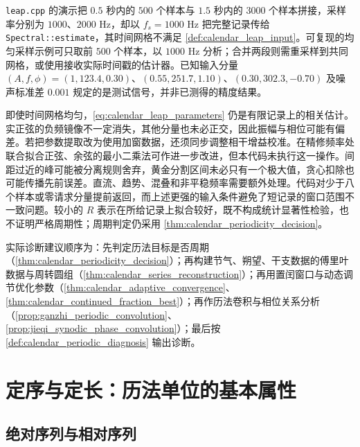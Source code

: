 \begin{remark}[实现的采样与估计限制]\label{rem:calendar_leap_limits}
\texttt{leap.cpp} 的演示把 \(0.5\) 秒内的 \(500\) 个样本与 \(1.5\) 秒内的 \(3000\) 个样本拼接，采样率分别为 \(1000\)、\(2000\) Hz，却以 \(f_s=1000\) Hz 把完整记录传给 \texttt{Spectral::estimate}，其时间网格不满足 \cref{def:calendar_leap_input}。可复现的均匀采样示例可只取前 \(500\) 个样本，以 \(1000\) Hz 分析；合并两段则需重采样到共同网格，或使用接收实际时间戳的估计器。已知输入分量 \((A,f,\phi)=(1,123.4,0.30)\)、\((0.55,251.7,1.10)\)、\((0.30,302.3,-0.70)\) 及噪声标准差 \(0.001\) 规定的是测试信号，并非已测得的精度结果。

即使时间网格均匀，\cref{eq:calendar_leap_parameters} 仍是有限记录上的相关估计。实正弦的负频镜像不一定消失，其他分量也未必正交，因此振幅与相位可能有偏差。若把参数提取改为使用加窗数据，还须同步调整相干增益校准。在精修频率处联合拟合正弦、余弦的最小二乘法可作进一步改进，但本代码未执行这一操作。间距过近的峰可能被分离规则舍弃，黄金分割区间未必只有一个极大值，贪心扣除也可能传播先前误差。直流、趋势、混叠和非平稳频率需要额外处理。代码对少于八个样本或零请求分量提前返回，而上述更强的输入条件避免了短记录的窗口范围不一致问题。较小的 \(R\) 表示在所给记录上拟合较好，既不构成统计显著性检验，也不证明严格周期性；周期判定仍采用 \cref{thm:calendar_periodicity_decision}。
\end{remark}

\begin{remark}[整合后的操作顺序]\label{rem:calendar_integration_order}
实际诊断建议顺序为：先判定历法目标是否周期（\cref{thm:calendar_periodicity_decision}）；再构建节气、朔望、干支数据的傅里叶数据与周转圆组（\cref{thm:calendar_series_reconstruction}）；再用置闰窗口与动态调节优化参数（\cref{thm:calendar_adaptive_convergence}、\cref{thm:calendar_continued_fraction_best}）；再作历法卷积与相位关系分析（\cref{prop:ganzhi_periodic_convolution}、\cref{prop:jieqi_synodic_phase_convolution}）；最后按 \cref{def:calendar_periodic_diagnosis} 输出诊断。
\end{remark}

\section{定序与定长：历法单位的基本属性}
\label{sec:calendar_sequence_length}

\subsection{绝对序列与相对序列}

